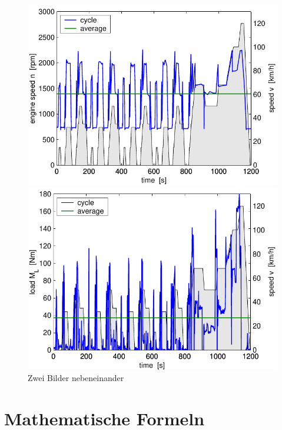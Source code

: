 \begin{figure}
  \begin{minipage}[t]{0.48\textwidth}
    \includegraphics[width = \textwidth]{images/cycle_we.pdf}
  \end{minipage}
  \hfill
  \begin{minipage}[t]{0.48\textwidth}
    \includegraphics[width = \textwidth]{images/cycle_ml.pdf}
  \end{minipage}
  \caption{Zwei Bilder nebeneinander}
  \label{pics:cycle}
\end{figure}


\section{Mathematische Formeln}\label{sec:math}

